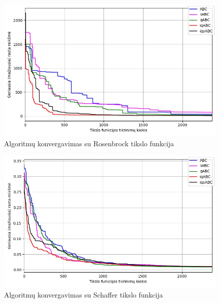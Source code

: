 \documentclass{VUMIFKompMagistrinis}
\begin{document}
\begin{landscape}
\begin{multicols}{2}
\begin{figure}[H]
    \centering
    \includegraphics[scale=0.45]{img/2kv/all_rosenbrock.jpg}
     \caption{Algoritmų konvergavimas su Rosenbrock tikslo funkcija}
    \label{img:kon6}
\end{figure}

\begin{figure}[H]
    \centering
    \includegraphics[scale=0.45]{img/2kv/all_schaffer.jpg}
     \caption{Algoritmų konvergavimas su Schaffer tikslo funkcija}
    \label{img:kon7a}
\end{figure}





\end{multicols}\newpage
\begin{multicols}{2}


\end{multicols}
\end{landscape}
\end{document}
